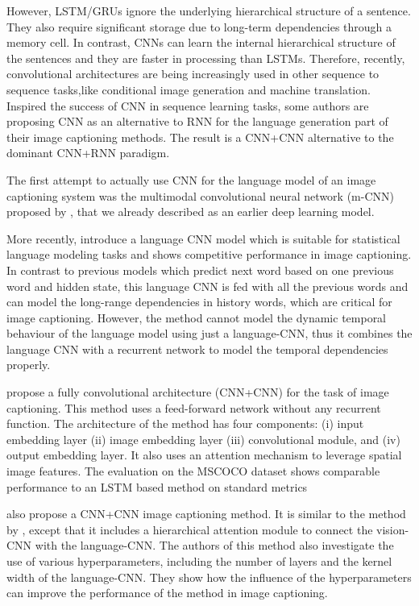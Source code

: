 However, LSTM/GRUs ignore the underlying hierarchical structure of a sentence. They also require significant storage due to long-term dependencies through a memory cell. In contrast, CNNs can learn the internal hierarchical structure of the sentences and they are faster in processing than LSTMs. Therefore, recently, convolutional architectures are being increasingly used in other sequence to sequence tasks,like conditional image generation and machine translation. Inspired the success of CNN in sequence learning tasks, some authors are proposing CNN as an alternative to RNN for the language generation part of their image captioning methods. The result is a CNN+CNN alternative to the dominant CNN+RNN paradigm.

The first attempt to actually use CNN for the language model of an image captioning system was the multimodal convolutional neural network (m-CNN) proposed by \citet{Ma2015}, that we already described as an earlier deep learning model. 

More recently, \citet{Gu2017} introduce a language CNN model which is suitable for statistical language modeling tasks and shows competitive performance in image captioning. In contrast to previous models which predict next word based on one previous word and hidden state, this language CNN is fed with all the previous words and can model the long-range dependencies in history words, which are critical for image captioning. However, the method cannot model the dynamic temporal behaviour of the language model using just a language-CNN, thus it combines the language CNN with a recurrent network to model the temporal dependencies properly.

\cite{Aneja2018} propose a fully convolutional architecture (CNN+CNN) for the task of image captioning. This method uses a feed-forward network without any recurrent function. The architecture of the method has four components: (i) input embedding layer (ii) image embedding layer (iii) convolutional module, and (iv) output embedding layer. It also uses an attention mechanism to leverage spatial image features. The evaluation on the MSCOCO dataset shows comparable performance to an LSTM based method on standard metrics

\citet{Wang2018} also propose a CNN+CNN image captioning method. It is similar to the method by \citeauthor{Aneja2018}, except that it includes a hierarchical attention module to connect the vision-CNN with the language-CNN. The authors of this method also investigate the use of various hyperparameters, including the number of layers and the kernel width of the language-CNN. They show how the influence of the hyperparameters can improve the performance of the method in image captioning.

